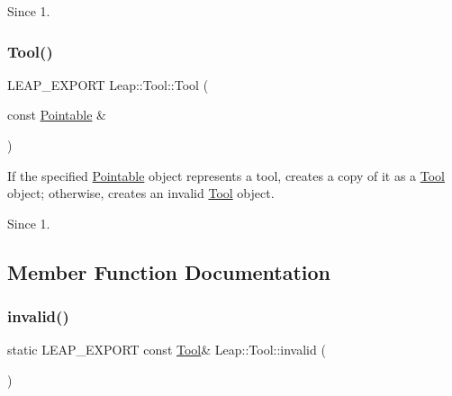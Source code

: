 \begin{DoxySince}{Since}
1. 
\end{DoxySince}
\mbox{\label{class_leap_1_1_tool_a6dfea4c318389bcc6d1ef373d7a4432e}} 
\subsubsection{\texorpdfstring{Tool()}{Tool()}\hspace{0.1cm}{\footnotesize\ttfamily [2/2]}}
{\footnotesize\ttfamily L\+E\+A\+P\+\_\+\+E\+X\+P\+O\+RT Leap\+::\+Tool\+::\+Tool (\begin{DoxyParamCaption}\item[{const \hyperlink{class_leap_1_1_pointable}{Pointable} \&}]{ }\end{DoxyParamCaption})\hspace{0.3cm}{\ttfamily [explicit]}}

If the specified \hyperlink{class_leap_1_1_pointable}{Pointable} object represents a tool, creates a copy of it as a \hyperlink{class_leap_1_1_tool}{Tool} object; otherwise, creates an invalid \hyperlink{class_leap_1_1_tool}{Tool} object.


\begin{DoxyCodeInclude}
\end{DoxyCodeInclude}


\begin{DoxySince}{Since}
1. 
\end{DoxySince}


\subsection{Member Function Documentation}
\mbox{\label{class_leap_1_1_tool_af47b7fe3674536f265470e7ab3467ef1}} 
\subsubsection{\texorpdfstring{invalid()}{invalid()}}
{\footnotesize\ttfamily static L\+E\+A\+P\+\_\+\+E\+X\+P\+O\+RT const \hyperlink{class_leap_1_1_tool}{Tool}\& Leap\+::\+Tool\+::invalid (\begin{DoxyParamCaption}{ }\end{DoxyParamCaption})\hspace{0.3cm}{\ttfamily [static]}}

